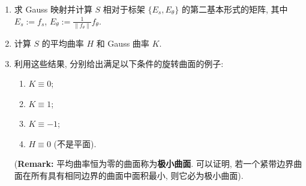 \begin{RiemannExercise}
\begin{enumerate}[label=(\arabic*),ref=\arabic*,leftmargin=*]
\begin{enumerate}[label=(\alph*),leftmargin=*]
\item 求 Gauss 映射并计算 $S$ 相对于标架 $\{E_s,E_\theta\}$ 的第二基本形式的矩阵, 其中 $E_s:=f_s$, $E_\theta:=\frac1{\lVert f_\theta\rVert}f_\theta$.
\item 计算 $S$ 的平均曲率 $H$ 和 Gauss 曲率 $K$.
\item 利用这些结果, 分别给出满足以下条件的旋转曲面的例子:
\begin{enumerate}[label=(\arabic*),leftmargin=*]
\item $K\equiv0$;
\item $K\equiv1$;
\item $K\equiv-1$;
\item $H\equiv0$ (不是平面).
\end{enumerate}
{\small (\textbf{Remark:} 平均曲率恒为零的曲面称为\textbf{极小曲面}. 可以证明, 若一个紧带边界曲面在所有具有相同边界的曲面中面积最小, 则它必为极小曲面).}
\end{enumerate}
\end{enumerate}
\end{RiemannExercise}
